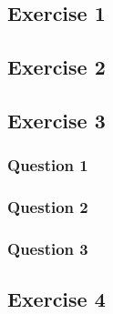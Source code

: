 \documentclass[12pt]{article}
\begin{document}
\subsection{Exercise 1}
\subsection{Exercise 2}
\subsection{Exercise 3}
\subsubsection{Question 1}
\subsubsection{Question 2}
\subsubsection{Question 3}
\subsection{Exercise 4}

\newpage
\appendix
\end{document}
